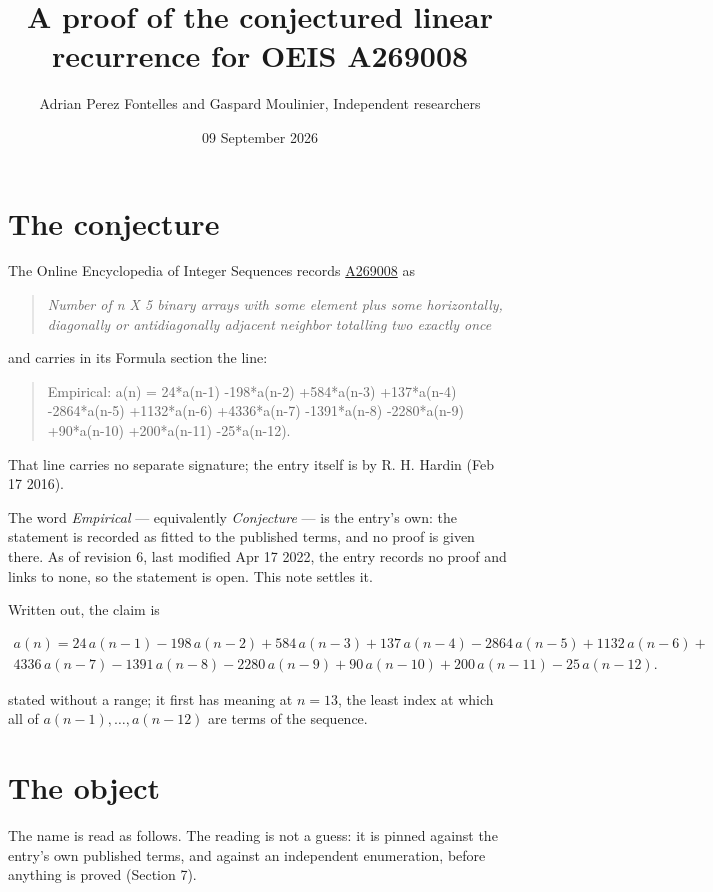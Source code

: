 \documentclass[11pt]{article}
\title{A proof of the conjectured linear recurrence for OEIS A269008}
\author{Adrian Perez Fontelles and Gaspard Moulinier, Independent researchers}
\date{09 September 2026}
\theoremstyle{definition}
\begin{document}
\maketitle
\section{The conjecture}

The Online Encyclopedia of Integer Sequences records \href{https://oeis.org/A269008}{A269008} as

\begin{quote}\itshape Number of n X 5 binary arrays with some element plus some horizontally, diagonally or antidiagonally adjacent neighbor totalling two exactly once\end{quote}

and carries in its Formula section the line:

\begin{quote}\ttfamily Empirical: a(n) = 24*a(n-1) -198*a(n-2) +584*a(n-3) +137*a(n-4) -2864*a(n-5) +1132*a(n-6) +4336*a(n-7) -1391*a(n-8) -2280*a(n-9) +90*a(n-10) +200*a(n-11) -25*a(n-12).\end{quote}

That line carries no separate signature; the entry itself is by R. H. Hardin (Feb 17 2016).

The word {\itshape Empirical} --- equivalently {\itshape Conjecture} --- is the entry's own: the statement is recorded as fitted to the published terms, and no proof is given there. As of revision 6, last modified Apr 17 2022, the entry records no proof and links to none, so the statement is open. This note settles it.

Written out, the claim is

\begin{multline*} a(n) = 24\,a(n-1) - 198\,a(n-2) + 584\,a(n-3) + 137\,a(n-4) - 2864\,a(n-5) + 1132\,a(n-6) + \\ 4336\,a(n-7) - 1391\,a(n-8) - 2280\,a(n-9) + 90\,a(n-10) + 200\,a(n-11) - 25\,a(n-12). \end{multline*}

stated without a range; it first has meaning at $n = 13$, the least index at which all of $a(n-1),\dots,a(n-12)$ are terms of the sequence.

\section{The object}

The name is read as follows. The reading is not a guess: it is pinned against the entry's own published terms, and against an independent enumeration, before anything is proved (Section 7).
\end{document}
